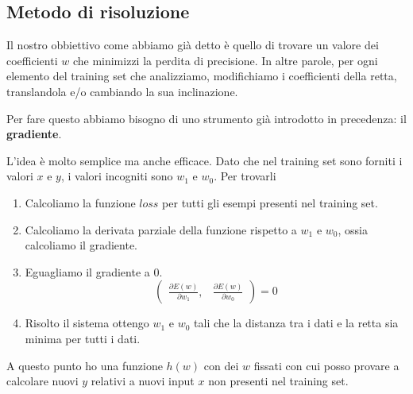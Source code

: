 \subsection{Metodo di risoluzione}
Il nostro obbiettivo come abbiamo gi\`a detto \`e quello di trovare un valore dei coefficienti $w$ che minimizzi la perdita
di precisione. In altre parole, per ogni elemento del training set che analizziamo, modifichiamo i coefficienti della retta,
translandola e/o cambiando la sua inclinazione.

Per fare questo abbiamo bisogno di uno strumento gi\`a introdotto in precedenza: il \textbf{gradiente}.

L'idea \`e molto semplice ma anche efficace. Dato che nel training set sono forniti i valori $x$ e $y$, i valori incogniti
sono $w_1$ e $w_0$. Per trovarli
\begin{enumerate}
	\item Calcoliamo la funzione $loss$ per tutti gli esempi presenti nel training set.
	\item Calcoliamo la derivata parziale della funzione rispetto a $w_1$ e $w_0$, ossia calcoliamo il gradiente.
	\item Eguagliamo il gradiente a 0.
	      \[
		      \begin{pmatrix}
			      \displaystyle\frac{ \partial E(w) }{ \partial w_1 }, &
			      \displaystyle\frac{ \partial E(w) }{ \partial w_0 }
		      \end{pmatrix} = 0
	      \]
	\item Risolto il sistema ottengo $w_1$ e $w_0$ tali che la distanza tra i dati e la retta sia minima per tutti i dati.
\end{enumerate}
A questo punto ho una funzione $h(w)$ con dei $w$ fissati con cui posso provare a calcolare nuovi $y$ relativi a nuovi
input $x$ non presenti nel training set.